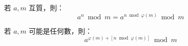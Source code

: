 \noindent
若 $a, m$ 互質，則：
$$a^n \bmod m = a^{n \bmod \varphi(m)} \bmod m$$

\noindent
若 $a, m$ 可能是任何數，則：
$$a^{\varphi(m)+[n \bmod{\varphi(m)}]} \bmod{m}$$